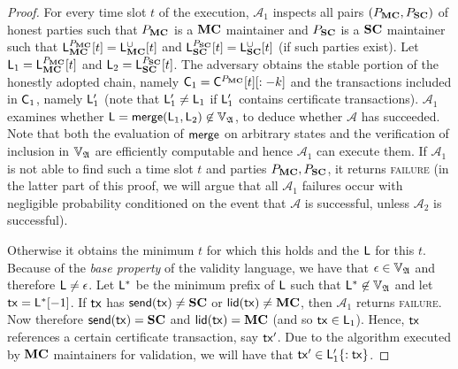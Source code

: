 \begin{proof}
  For every time slot $t$ of the execution, $\mathcal{A}_1$ inspects all pairs
  $(\party_\Mainchain, \party_\Sidechain)$ of honest parties such that $\party_\Mainchain$ is a $\Mainchain$
  maintainer and $\party_\Sidechain$ is a $\Sidechain$ maintainer such that
  $\LState_\Mainchain^{\party_\Mainchain}[t] = \LState_\Mainchain^\cup[t]$ and
  $\LState_\Sidechain^{\party_\Sidechain}[t] = \LState_\Sidechain^\cup[t]$ (if such parties exist).
  Let $\LState_1 = \LState_\Mainchain^{\party_\Mainchain}[t]$ and
  $\LState_2 = \LState_\Sidechain^{\party_\Sidechain}[t]$.
  The adversary obtains the stable portion of the
  honestly adopted chain, namely $\Chain_1 = \LView{\Chain}{\party_\Mainchain}{t}[:-k]$ and the
  transactions included in $\Chain_1$, namely $\LState'_1$ (note that
  $\LState'_1 \neq \LState_1$ if $\LState'_1$ contains certificate
  transactions). $\mathcal{A}_1$ examines whether $\LState = \merge(\LState_1,
  \LState_2) \not\in\adalang$, to deduce whether $\mathcal{A}$ has succeeded.
  Note that both the evaluation of $\merge$ on arbitrary states and the
  verification of inclusion in $\adalang$ are efficiently computable and hence
  $\mathcal{A}_1$ can execute them. If $\mathcal{A}_1$ is not able to find such
  a time slot $t$ and parties $\party_\Mainchain, \party_\Sidechain$, it returns \textsc{failure}
  (in the latter part of this proof, we will argue that all $\mathcal{A}_1$
  failures occur with negligible probability conditioned on the event that
  $\mathcal{A}$ is successful, unless $\mathcal{A}_2$ is successful).

  Otherwise it obtains the minimum $t$ for which this holds and the $\LState$
  for this $t$. Because of the \emph{base property} of the validity language, we
  have that $\epsilon \in \adalang$ and therefore $\LState \neq \epsilon$. Let
  $\LState^*$ be the minimum prefix of $\LState$ such that $\LState^* \not\in
  \adalang$ and let $\tx = \LState^*[-1]$. If $\tx$ has $\send(\tx) \neq \Sidechain$ or
  $\llid(\tx) \neq \Mainchain$, then $\mathcal{A}_1$ returns \textsc{failure}. Now
  therefore $\send(\tx) = \Sidechain$ and $\llid(\tx) = \Mainchain$ (and so $\tx \in \LState_1$).
  Hence, $\tx$ references a certain certificate transaction, say $\tx'$. Due to
  the algorithm executed by $\Mainchain$ maintainers for validation, we will have that
  $\tx' \in \LState'_1\{:\tx\}$.


\end{proof}
